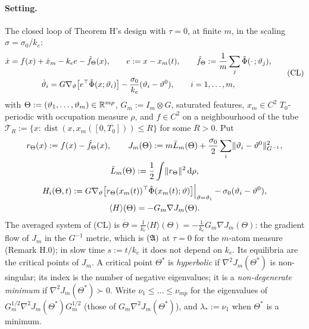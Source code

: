 \paragraph{Setting.} The closed loop of Theorem H's design with $\tau = 0$, at finite $m$, in the scaling
$\sigma = \sigma_0/k_e$:
\begin{equation}\label{eq:thmJ:CL}
  \begin{gathered}
    \dot x = f(x) + \dot x_m - k_e e - \hat f_\Theta(x),\qquad e := x - x_m(t),\qquad
    \hat f_\Theta := \frac1m\sum_j\tilde\Phi(\cdot\,;\vartheta_j),\\
    \dot\vartheta_i = G\nabla_\vartheta\bigl[e^\top\tilde\Phi(x;\vartheta_i)\bigr]
    - \frac{\sigma_0}{k_e}(\vartheta_i - \vartheta^0),\qquad i = 1,\dots,m,
  \end{gathered}
  \tag{CL}
\end{equation}
with $\Theta := (\vartheta_1,\dots,\vartheta_m)\in\mathbb{R}^{mp}$, $G_m := I_m\otimes G$, saturated features, $x_m\in C^2$
$T_0$-periodic with occupation measure $\rho$, and $f\in C^2$ on a neighbourhood of the tube
$\mathcal T_R := \{x : \operatorname{dist}(x,x_m([0,T_0])) \le R\}$ for some $R>0$. Put
\begin{gather*}
  r_\Theta(x) := f(x) - \hat f_\Theta(x),\qquad
  J_m(\Theta) := m\bar L_m(\Theta) + \frac{\sigma_0}{2}\sum_i\lVert \vartheta_i - \vartheta^0\rVert^2_{G^{-1}},\\
  \bar L_m(\Theta) := \frac12\int\lVert r_\Theta\rVert^2\,\mathrm{d}\rho,\\
  H_i(\Theta,t) := G\nabla_\vartheta\bigl[r_\Theta(x_m(t))^\top\tilde\Phi(x_m(t);\vartheta)\bigr]\Big|_{\vartheta=\vartheta_i}
  - \sigma_0(\vartheta_i - \vartheta^0),\\
  \langle H\rangle(\Theta) = -G_m\nabla J_m(\Theta).
\end{gather*}
The averaged system of \textup{(CL)} is
$\dot\Theta = \frac1{k_e}\langle H\rangle(\Theta) = -\frac1{k_e}G_m\nabla J_m(\Theta)$: the gradient flow of $J_m$ in
the $G^{-1}$ metric, which is $(\mathfrak{A})$ at $\tau = 0$ for the $m$-atom measure (Remark H.0); in slow time
$s := t/k_e$ it does not depend on $k_e$. Its equilibria are the critical points of $J_m$. A critical point $\Theta^*$
is \emph{hyperbolic} if $\nabla^2J_m(\Theta^*)$ is non-singular; its index is the number of negative eigenvalues; it
is a \emph{non-degenerate minimum} if $\nabla^2J_m(\Theta^*)\succ0$. Write $\nu_1\le\dots\le\nu_{mp}$ for the
eigenvalues of $G_m^{1/2}\nabla^2J_m(\Theta^*)G_m^{1/2}$ (those of $G_m\nabla^2J_m(\Theta^*)$), and
$\lambda_* := \nu_1$ when $\Theta^*$ is a minimum.


